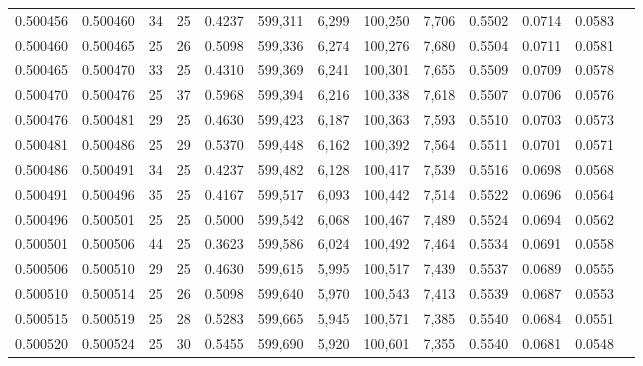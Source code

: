\begin{tabular}{rrrrrrrrrrrrr}
0.500456 & 0.500460 &    34 &  25 &                                     0.4237 & 599,311 &   6,299 & 100,250 &   7,706 & 0.5502 & 0.0714 & 0.0583 \\
0.500460 & 0.500465 &    25 &  26 &                                     0.5098 & 599,336 &   6,274 & 100,276 &   7,680 & 0.5504 & 0.0711 & 0.0581 \\
0.500465 & 0.500470 &    33 &  25 &                                     0.4310 & 599,369 &   6,241 & 100,301 &   7,655 & 0.5509 & 0.0709 & 0.0578 \\
0.500470 & 0.500476 &    25 &  37 &                                     0.5968 & 599,394 &   6,216 & 100,338 &   7,618 & 0.5507 & 0.0706 & 0.0576 \\
0.500476 & 0.500481 &    29 &  25 &                                     0.4630 & 599,423 &   6,187 & 100,363 &   7,593 & 0.5510 & 0.0703 & 0.0573 \\
0.500481 & 0.500486 &    25 &  29 &                                     0.5370 & 599,448 &   6,162 & 100,392 &   7,564 & 0.5511 & 0.0701 & 0.0571 \\
0.500486 & 0.500491 &    34 &  25 &                                     0.4237 & 599,482 &   6,128 & 100,417 &   7,539 & 0.5516 & 0.0698 & 0.0568 \\
0.500491 & 0.500496 &    35 &  25 &                                     0.4167 & 599,517 &   6,093 & 100,442 &   7,514 & 0.5522 & 0.0696 & 0.0564 \\
0.500496 & 0.500501 &    25 &  25 &                                     0.5000 & 599,542 &   6,068 & 100,467 &   7,489 & 0.5524 & 0.0694 & 0.0562 \\
0.500501 & 0.500506 &    44 &  25 &                                     0.3623 & 599,586 &   6,024 & 100,492 &   7,464 & 0.5534 & 0.0691 & 0.0558 \\
0.500506 & 0.500510 &    29 &  25 &                                     0.4630 & 599,615 &   5,995 & 100,517 &   7,439 & 0.5537 & 0.0689 & 0.0555 \\
0.500510 & 0.500514 &    25 &  26 &                                     0.5098 & 599,640 &   5,970 & 100,543 &   7,413 & 0.5539 & 0.0687 & 0.0553 \\
0.500515 & 0.500519 &    25 &  28 &                                     0.5283 & 599,665 &   5,945 & 100,571 &   7,385 & 0.5540 & 0.0684 & 0.0551 \\
0.500520 & 0.500524 &    25 &  30 &                                     0.5455 & 599,690 &   5,920 & 100,601 &   7,355 & 0.5540 & 0.0681 & 0.0548 \\

\end{tabular}
